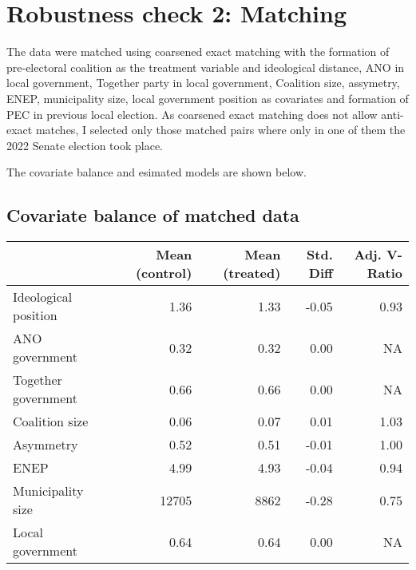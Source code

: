 \documentclass[fignum,12pt,titlepage]{article}
\begin{document}
\newpage
\section{Robustness check 2: Matching}
\label{app:2}

The data were matched using coarsened exact matching with the formation of pre-electoral coalition as the treatment variable and ideological distance, ANO in local government, Together party in local government, Coalition size, assymetry, ENEP, municipality size, local government position as covariates and formation of PEC in previous local election. 
As coarsened exact matching does not allow anti-exact matches, I selected only those matched pairs where only in one of them the 2022 Senate election took place.

The covariate balance and esimated models are shown below.

\subsection{Covariate balance of matched data \label{tab:4}}
\begin{tabular}{lrrrr}
\hline
 & Mean (control) & Mean (treated) & Std. Diff & Adj. V-Ratio\\
\hline
Ideological position & 1.36 & 1.33 & -0.05 & 0.93\\
\hline
ANO government & 0.32 & 0.32 & 0.00 & NA\\
\hline
Together government & 0.66 & 0.66 & 0.00 & NA\\
\hline
Coalition size  & 0.06 & 0.07 & 0.01 & 1.03\\
\hline
Asymmetry & 0.52 & 0.51 & -0.01 & 1.00\\
\hline
ENEP & 4.99 & 4.93 & -0.04 & 0.94\\
\hline
Municipality size & 12705 & 8862 & -0.28 & 0.75\\
\hline
Local government & 0.64 & 0.64 & 0.00 & NA\\
\hline
\end{tabular}
\end{document}

